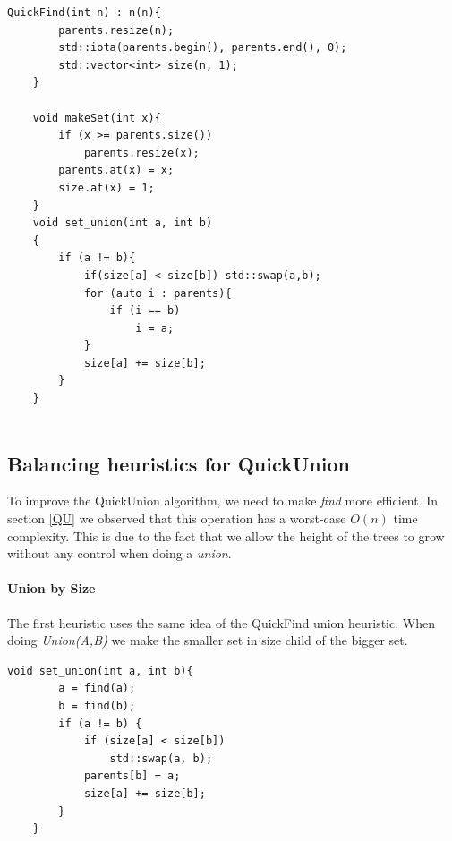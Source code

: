 \documentclass{article}
\begin{document}
\begin{lstlisting}[caption=updated operations in QuickFind, label=lab:qfu]
    QuickFind(int n) : n(n){
        parents.resize(n);
        std::iota(parents.begin(), parents.end(), 0);
        std::vector<int> size(n, 1);
    }

    void makeSet(int x){
        if (x >= parents.size())
            parents.resize(x);
        parents.at(x) = x;
        size.at(x) = 1;
    }
    void set_union(int a, int b)
    {
        if (a != b){
            if(size[a] < size[b]) std::swap(a,b);
            for (auto i : parents){
                if (i == b)
                    i = a;
            }
            size[a] += size[b];
        }
    }
    
\end{lstlisting}
\subsection{Balancing heuristics for QuickUnion}
To improve the QuickUnion algorithm, we need to make \emph{find} more efficient.
In section \ref{QU} we observed that this operation has a worst-case $O(n)$ time complexity.
This is due to the fact that we allow the height of the trees to grow without any control when 
doing a \emph{union}. 
\paragraph{Union by Size}
The first heuristic uses the same idea of the QuickFind union heuristic. When doing \emph{Union(A,B)}
we make the smaller set in size child of the bigger set.
\begin{lstlisting}[caption=Union by size implementation, label=quu]
    void set_union(int a, int b){
        a = find(a);
        b = find(b);
        if (a != b) {
            if (size[a] < size[b])
                std::swap(a, b);
            parents[b] = a;
            size[a] += size[b];
        }
    }

\end{lstlisting}
\end{document}
